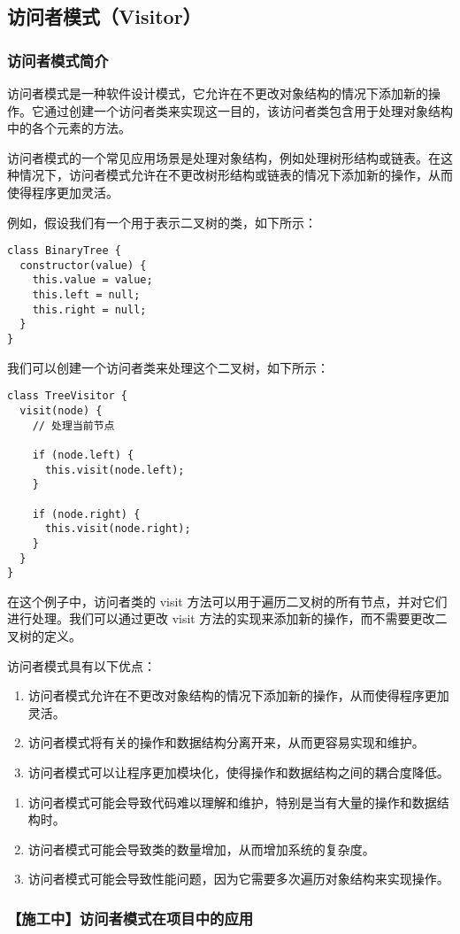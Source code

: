 \subsection{访问者模式（Visitor）}

\subsubsection{访问者模式简介}

访问者模式是一种软件设计模式，它允许在不更改对象结构的情况下添加新的操作。它通过创建一个访问者类来实现这一目的，该访问者类包含用于处理对象结构中的各个元素的方法。

访问者模式的一个常见应用场景是处理对象结构，例如处理树形结构或链表。在这种情况下，访问者模式允许在不更改树形结构或链表的情况下添加新的操作，从而使得程序更加灵活。

例如，假设我们有一个用于表示二叉树的类，如下所示：

\begin{lstlisting}
class BinaryTree {
  constructor(value) {
    this.value = value;
    this.left = null;
    this.right = null;
  }
}
\end{lstlisting}

我们可以创建一个访问者类来处理这个二叉树，如下所示：

\begin{lstlisting}
class TreeVisitor {
  visit(node) {
    // 处理当前节点

    if (node.left) {
      this.visit(node.left);
    }

    if (node.right) {
      this.visit(node.right);
    }
  }
}
\end{lstlisting}

在这个例子中，访问者类的 visit 方法可以用于遍历二叉树的所有节点，并对它们进行处理。我们可以通过更改 visit 方法的实现来添加新的操作，而不需要更改二叉树的定义。

访问者模式具有以下优点：

\begin{enumerate}
\item 访问者模式允许在不更改对象结构的情况下添加新的操作，从而使得程序更加灵活。
\item 访问者模式将有关的操作和数据结构分离开来，从而更容易实现和维护。
\item 访问者模式可以让程序更加模块化，使得操作和数据结构之间的耦合度降低。
\end{enumerate}

\begin{enumerate}
\item 访问者模式可能会导致代码难以理解和维护，特别是当有大量的操作和数据结构时。
\item 访问者模式可能会导致类的数量增加，从而增加系统的复杂度。
\item 访问者模式可能会导致性能问题，因为它需要多次遍历对象结构来实现操作。
\end{enumerate}

\subsubsection{【施工中】访问者模式在项目中的应用}